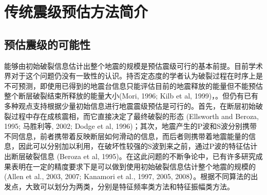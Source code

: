 
\chapter{传统震级预估方法简介}

\section{预估震级的可能性}

\indent 能够由初始破裂信息估计出整个地震的规模是预估震级可行的基本前提。目前学术界对于这个问题仍没有一致性的认识。持否定态度的学者认为破裂过程在时序上是不可预测，即使用已得到的地震台信息只能评估目前的地震释放的能量但不能预估整个断层破裂结束所释放的能量大小(Mori, 1996; Kilb et al, 1999)，。但仍有已有多种观点支持根据少量初始信息进行地震震级预估是可行的。首先，在断层初始破裂过程中存在成核震相，而它直接决定了最终破裂的形态 (Ellsworth and Beroza, 1995; 马胜利等, 2002; Dodge et al, 1996)；其次，地震产生的P波和S波分别携带不同信息，前者携带着反映断层如何滑动的信息，而后者则携带着地震能量的信息，因此可以分别加以利用，在破坏性较强的S波到来之前，通过P波的特征估计出断层破裂信息 (Beroza et al, 1995)。在这此问题的不断争论中，已有许多研究成果表明在一定的精度要求下是可以做到使用初始破裂信息估计整个地震的规模的 (Allen et al., 2003, 2007; Kanamori et al., 1997, 2005, 2008）。根据不同算法的出发点，大致可以划分为两类，分别是特征频率类方法和特征振幅类方法。\\
